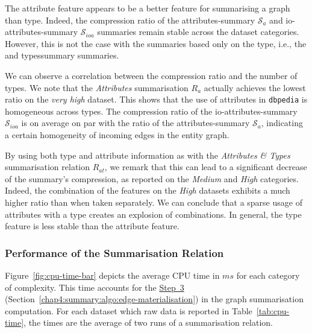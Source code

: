 The attribute feature appears to be a better feature for summarising a graph than type. Indeed, the compression ratio of the \gls{attributes-summary} $\mathcal{S}_{a}$ and \gls{io-attributes-summary} $\mathcal{S}_{ioa}$ summaries remain stable across the dataset categories. However, this is not the case with the summaries based only on the type, i.e., the  and \gls{typessummary} summaries.

We can observe a correlation between the compression ratio and the number of types.
We note that the \emph{Attributes} summarisation $R_a$ actually achieves the lowest ratio on the \emph{very high} dataset. This shows that the use of attributes in \texttt{dbpedia} is homogeneous across types. The compression ratio of the \gls{io-attributes-summary} $\mathcal{S}_{ioa}$ is on average on par with the ratio of the \gls{attributes-summary} $\mathcal{S}_a$, indicating a certain homogeneity of incoming edges in the entity graph.

By using both type and attribute information as with the \emph{Attributes \& Types} summarisation relation $R_{at}$, we remark that this can lead to a significant decrease of the summary's compression, as reported on the \emph{Medium} and \emph{High} categories.
Indeed, the combination of the features on the \emph{High} datasets exhibits a much higher ratio than when taken separately.%
We can conclude that a sparse usage of attributes with a type creates an explosion of combinations. In general, the type feature is less stable than the attribute feature.



\subsubsection{Performance of the Summarisation Relation}

Figure~\ref{fig:cpu-time-bar} depicts the average CPU time in $ms$ for each category of complexity. This time accounts for the \hyperref[step-he]{Step~3} (Section~\ref{chap4:summary:algo:edge-materialisation}) in the graph summarisation computation.
For each dataset which raw data is reported in Table~\ref{tab:cpu-time}, the times are the average of two runs of a summarisation relation.

